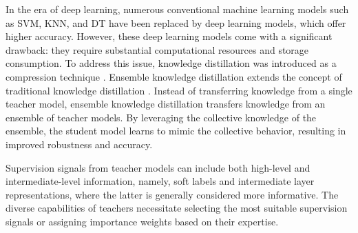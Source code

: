 In the era of deep learning, numerous conventional machine learning models such as SVM, KNN, and DT have been replaced by deep learning models, which offer higher accuracy. However, these deep learning models come with a significant drawback: they require substantial computational resources and storage consumption. To address this issue, knowledge distillation was introduced as a compression technique \cite{gou2021knowledge}. 
Ensemble knowledge distillation extends the concept of traditional knowledge distillation \cite{asif2019ensemble}. Instead of transferring knowledge from a single teacher model, ensemble knowledge distillation transfers knowledge from an ensemble of teacher models. By leveraging the collective knowledge of the ensemble, the student model learns to mimic the collective behavior, resulting in improved robustness and accuracy.

Supervision signals from teacher models can include both high-level and intermediate-level information, namely, soft labels and intermediate layer representations, where the latter is generally considered more informative. 
The diverse capabilities of teachers necessitate selecting the most suitable supervision signals or assigning importance weights based on their expertise. 

